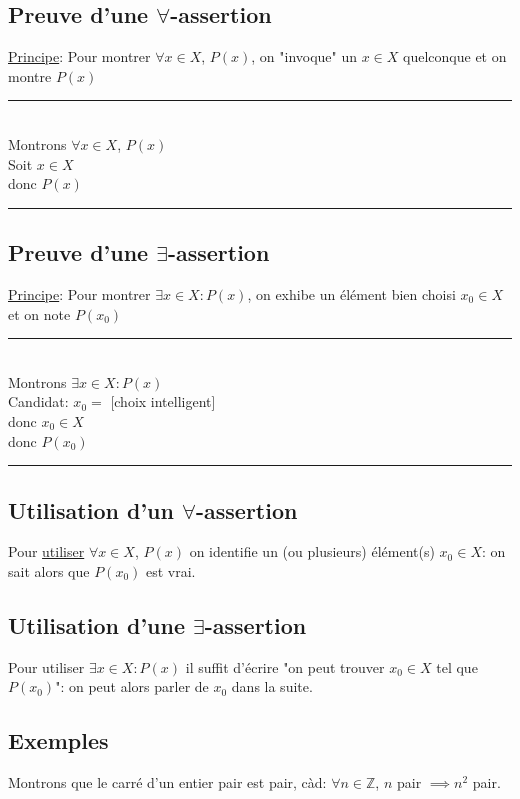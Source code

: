 \documentclass[10pt,a4paper]{article}
\theoremstyle{definition}
\begin{document}
\subsection{Preuve d'une $\forall$-assertion}
\noindent \uline{Principe}: Pour montrer $\forall x \in X$, $P(x)$, on "invoque" un $x \in X$ quelconque et on montre $P(x)$ \\
\rule{13em}{0.5pt} \\
\indent Montrons $\forall x \in X$, $P(x)$ \\
\indent Soit $x \in X$ \\
 donc $P(x)$ \\
\rule{13em}{0.5pt}

\subsection{Preuve d'une $\exists$-assertion}
\noindent \uline{Principe}: Pour montrer $\exists x \in X: P(x)$, on exhibe un élément bien choisi $x_0 \in X$ et on note $P(x_0)$ \\
\rule{18em}{0.5pt} \\
\indent Montrons $\exists x \in X: P(x)$ \\
\indent Candidat: $x_0 =$ [choix intelligent] \\
 donc $x_0 \in X$ \\
 donc $P(x_0)$ \\
\rule{18em}{0.5pt}

\subsection{Utilisation d'un $\forall$-assertion}
\noindent Pour \uline{utiliser} $\forall x \in X$, $P(x)$ on identifie un (ou plusieurs) élément(s) $x_0 \in X$: on sait alors que $P(x_0)$ est vrai.

\subsection{Utilisation d'une $\exists$-assertion}
\noindent Pour utiliser $\exists x \in X: P(x)$ il suffit d'écrire "on peut trouver $x_0 \in X$ tel que $P(x_0)$": on peut alors parler de $x_0$ dans la suite.

\subsection{Exemples}
Montrons que le carré d'un entier pair est pair, càd: $\forall n \in \mathbb{Z}$, $n$ pair $\implies n^2$ pair. \medskip
\end{document}
